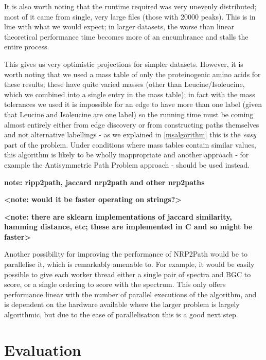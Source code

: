 \documentclass{l4proj}
\newcommand{\cit}[1]{\citep{#1}}
\begin{document}
It is also worth noting that the runtime required was very unevenly distributed; most of it came from single, very large files (those with 20000 peaks). This is in line with what we would expect; in larger datasets, the worse than linear theoretical performance time becomes more of an encumbrance and stalls the entire process.

This gives us very optimistic projections for simpler datasets. However, it is worth noting that we used a mass table of only the proteinogenic amino acids for these results; these have quite varied masses (other than Leucine/Isoleucine, which we combined into a single entry in the mass table); in fact with the mass tolerances we used it is impossible for an edge to have more than one label (given that Leucine and Isoleucine are one label) so the running time must be coming almost entirely either from edge discovery or from constructing paths themselves and not alternative labellings - as we explained in \ref{msalgorithm} this is the \textit{easy} part of the problem. Under conditions where mass tables contain similar values, this algorithm is likely to be wholly inappropriate and another approach - for example the Antisymmetric Path Problem approach \cit{msbook} - should be used instead.

\textbf{note: ripp2path, jaccard nrp2path and other nrp2paths}

\textbf{<note: would it be faster operating on strings?>}

\textbf{<note: there are sklearn implementations of jaccard similarity, hamming distance, etc; these are implemented in C and so might be faster>}

Another possibility for improving the performance of NRP2Path would be to parallelise it, which is remarkably amenable to. For example, it would be easily possible to give each worker thread either a single pair of spectra and BGC to score, or a single ordering to score with the spectrum. This only offers performance linear with the number of parallel executions of the algorithm, and is dependent on the hardware available where the larger problem is largely algorithmic, but due to the ease of parallelisation this is a good next step.

\chapter{Evaluation} 
\end{document}
